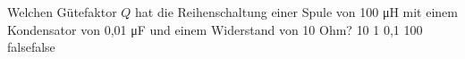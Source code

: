     {Welchen Gütefaktor $Q$ hat die Reihenschaltung einer Spule von 100 μH mit einem Kondensator von 0,01 μF und einem Widerstand von 10 Ohm?}
    {10}
    {1}
    {0,1}
    {100}
    {false}{false}